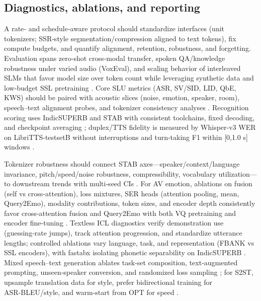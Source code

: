 \subsection{Diagnostics, ablations, and reporting} \label{subsec:Diagnostics, ablations, and reporting}
A rate‑ and schedule‑aware protocol should standardize interfaces (unit tokenizers; SSR‑style segmentation/compression aligned to text tokens), fix compute budgets, and quantify alignment, retention, robustness, and forgetting. Evaluation spans zero‑shot cross‑modal transfer, spoken QA/knowledge robustness under varied audio (VoxEval), and scaling behavior of interleaved SLMs that favor model size over token count while leveraging synthetic data and low‑budget SSL pretraining \cite{cui2025voxevalbenchmarkingknowledgeunderstandin,maimon2025scalinganalysisinterleavedspeechtextlang,tan2025ssralignmentawaremodalityconnectorspeech,chen2023reducingbarriersselfsupervisedlearninghu,entry2025towardjointlanguagemodelingspeechunitste}. Core SLU metrics (ASR, SV/SID, LID, QbE, KWS) should be paired with acoustic slices (noise, emotion, speaker, room), speech–text alignment probes, and tokenizer consistency analyses \cite{har-tuv2025pastphoneticacousticspeechtokenizer,turetzky2024lastlanguagemodelawarespeechtokenization,bai2025dmelspeechtokenizationmadesimple,entry2025indicsuperbspeechprocessinguniversalperf,maimon2025salmonsuiteacousticlanguagemodelevaluati}. Recognition scoring uses IndicSUPERB and STAB with consistent toolchains, fixed decoding, and checkpoint averaging \cite{vashishth2024stabspeechtokenizerassessmentbenchmark,entry2025indicsuperbspeechprocessinguniversalperf}; duplex/TTS fidelity is measured by Whisper‑v3 WER on LibriTTS‑testsetB without interruptions and turn‑taking F1 within [0,1.0 s] windows \cite{ma2024languagemodelcanlistenwhilespeaking}.

Tokenizer robustness should connect STAB axes—speaker/context/language invariance, pitch/speed/noise robustness, compressibility, vocabulary utilization—to downstream trends with multi‑seed CIs \cite{vashishth2024stabspeechtokenizerassessmentbenchmark}. For AV emotion, ablations on fusion (self vs cross‑attention), loss mixtures, SER heads (attention pooling, mean, Query2Emo), modality contributions, token sizes, and encoder depth consistently favor cross‑attention fusion and Query2Emo with both VQ pretraining and encoder fine‑tuning \cite{sadok2025vectorquantizedmaskedautoencoderaudiovis}. Textless ICL diagnostics verify demonstration use (guessing‑rate jumps), track attention progression, and standardize utterance lengths; controlled ablations vary language, task, and representation (FBANK vs SSL encoders), with fastabx isolating phonetic separability on IndicSUPERB \cite{hsu2024exploringcontextlearningtextlessspeechla,poli2025fastabxlibraryefficientcomputationabxdis,entry2025indicsuperbspeechprocessinguniversalperf}. Mixed speech–text generation ablates task‑set composition, text‑augmented prompting, unseen‑speaker conversion, and randomized loss sampling \cite{wu2024speechcomposerunifyingmultiplespeechtask}; for S2ST, upsample translation data for style, prefer bidirectional training for ASR‑BLEU/style, and warm‑start from OPT for speed \cite{peng2024mslms2stmultitaskspeechlanguagemodeltext}.

